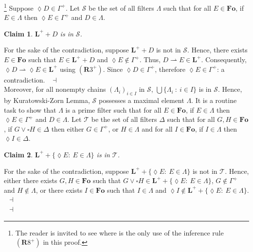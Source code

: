 \documentclass[draft]{article}
\newtheorem{claim}{Claim}
\newenvironment{proof}{{\bf Proof:}}{~$\dashv$\\}
\def\Rule{\mathbf{R}}
\def\Fo{\mathbf{Fo}}
\def\L{\mathbf{L}}
\begin{document}
%
\begin{proof}\footnote{The reader is invited to see where is the only use of the inference rule $(\Rule8^{+})$ in this proof.}
%
%
Suppose ${\lozenge}D{\in}\Gamma^{+}$.
Let ${\mathcal S}$ be the set of all filters $\Lambda$ such that for all $E{\in}\Fo$, if $E{\in}\Lambda$ then ${\lozenge}E{\in}\Gamma^{+}$ and $D{\in}\Lambda$.
%
%
\begin{claim}
%
%
$\L^{+}{+}D$ is in ${\mathcal S}$.
%
%
\end{claim}
%
%
\begin{proof}
%
%
For the sake of the contradiction, suppose $\L^{+}{+}D$ is not in ${\mathcal S}$.
Hence, there exists $E{\in}\Fo$ such that $E{\in}\L^{+}{+}D$ and ${\lozenge}E{\not\in}\Gamma^{+}$.
Thus, $D{\rightharpoonup}E{\in}\L^{+}$.
Consequently, ${\lozenge}D{\rightharpoonup}{\lozenge}E{\in}\L^{+}$ using $(\Rule3^{+})$.
Since ${\lozenge}D{\in}\Gamma^{+}$, therefore ${\lozenge}E{\in}\Gamma^{+}$: a contradiction.
%
%
\medskip
%
%
\end{proof}
%
%
Moreover, for all nonempty chains $(\Lambda_{i})_{i{\in}I}$ in ${\mathcal S}$, $\bigcup\{\Lambda_{i}\ :\ i{\in}I\}$ is in ${\mathcal S}$.
Hence, by Kuratowski-Zorn Lemma, ${\mathcal S}$ possesses a maximal element $\Lambda$.
It is a routine task to show that $\Lambda$ is a prime filter such that for all $E{\in}\Fo$, if $E{\in}\Lambda$ then ${\lozenge}E{\in}\Gamma^{+}$ and $D{\in}\Lambda$.
Let ${\mathcal T}$ be the set of all filters $\Delta$ such that for all $G,H{\in}\Fo$, if $G{\vee}{\square}H{\in}\Delta$ then either $G{\in}\Gamma^{+}$, or $H{\in}\Lambda$ and for all $I{\in}\Fo$, if $I{\in}\Lambda$ then ${\lozenge}I{\in}\Delta$.
%
%
\begin{claim}
%
%
$\L^{+}{+}\{{\lozenge}E:\ E{\in}\Lambda\}$ is in ${\mathcal T}$.
%
%
\end{claim}
%
%
\begin{proof}
%
%
For the sake of the contradiction, suppose $\L^{+}{+}\{{\lozenge}E:\ E{\in}\Lambda\}$ is not in ${\mathcal T}$.
Hence, either there exists $G,H{\in}\Fo$ such that $G{\vee}{\square}H{\in}\L^{+}{+}\{{\lozenge}E:\ E{\in}\Lambda\}$, $G{\not\in}\Gamma^{+}$ and $H{\not\in}\Lambda$, or there exists $I{\in}\Fo$ such that $I{\in}\Lambda$ and ${\lozenge}I{\not\in}\L^{+}{+}\{{\lozenge}E:\ E{\in}\Lambda\}$.
%
%
\\

\end{proof}
\end{proof}
\end{document}
